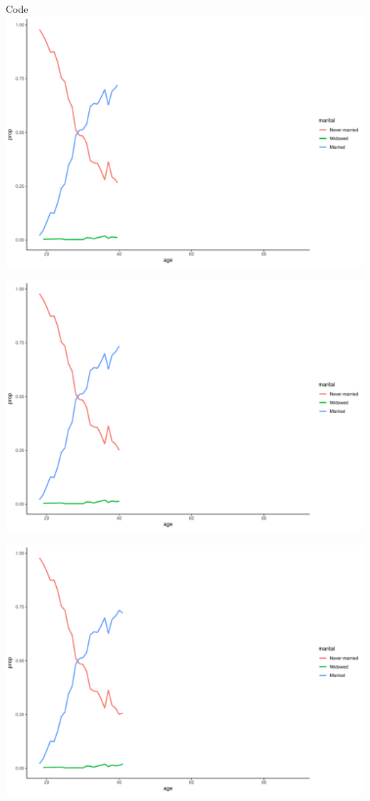 \documentclass[
  ignorenonframetext,
]{beamer}
\begin{document}
\begin{frame}[fragile]{Code}
\includegraphics{gss_cat_files/figure-beamer/unnamed-chunk-1-35.pdf}

\includegraphics{gss_cat_files/figure-beamer/unnamed-chunk-1-36.pdf}

\includegraphics{gss_cat_files/figure-beamer/unnamed-chunk-1-37.pdf}


\end{frame}
\end{document}
